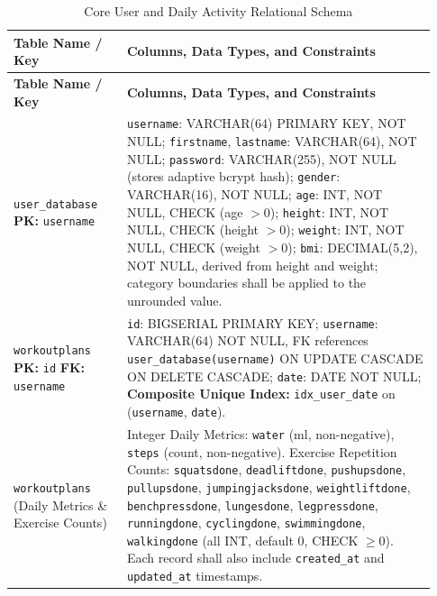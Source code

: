 \documentclass[11pt,a4paper]{report}
\begin{document}
\begin{longtable}{P{0.25\linewidth}P{0.68\linewidth}}
\caption{Core User and Daily Activity Relational Schema}\label{tab:core-schema}\\
\toprule
\textbf{Table Name / Key} & \textbf{Columns, Data Types, and Constraints} \\
\midrule
\endfirsthead
\toprule
\textbf{Table Name / Key} & \textbf{Columns, Data Types, and Constraints} \\
\midrule
\endhead
\texttt{user\_database} \newline \textbf{PK:} \texttt{username} & \texttt{username}: VARCHAR(64) PRIMARY KEY, NOT NULL; \newline \texttt{firstname}, \texttt{lastname}: VARCHAR(64), NOT NULL; \newline \texttt{password}: VARCHAR(255), NOT NULL (stores adaptive bcrypt hash); \newline \texttt{gender}: VARCHAR(16), NOT NULL; \newline \texttt{age}: INT, NOT NULL, CHECK (age $> 0$); \newline \texttt{height}: INT, NOT NULL, CHECK (height $> 0$); \newline \texttt{weight}: INT, NOT NULL, CHECK (weight $> 0$); \newline \texttt{bmi}: DECIMAL(5,2), NOT NULL, derived from height and weight; category boundaries shall be applied to the unrounded value. \\
\midrule
\texttt{workoutplans} \newline \textbf{PK:} \texttt{id} \newline \textbf{FK:} \texttt{username} & \texttt{id}: BIGSERIAL PRIMARY KEY; \newline \texttt{username}: VARCHAR(64) NOT NULL, FK references \texttt{user\_database(username)} ON UPDATE CASCADE ON DELETE CASCADE; \newline \texttt{date}: DATE NOT NULL; \newline \textbf{Composite Unique Index:} \texttt{idx\_user\_date} on (\texttt{username}, \texttt{date}). \\
\midrule
\texttt{workoutplans} \newline (Daily Metrics \& Exercise Counts) & Integer Daily Metrics: \texttt{water} (ml, non-negative), \texttt{steps} (count, non-negative). \newline Exercise Repetition Counts: \texttt{squatsdone}, \texttt{deadliftdone}, \texttt{pushupsdone}, \texttt{pullupsdone}, \texttt{jumpingjacksdone}, \texttt{weightliftdone}, \texttt{benchpressdone}, \texttt{lungesdone}, \texttt{legpressdone}, \texttt{runningdone}, \texttt{cyclingdone}, \texttt{swimmingdone}, \texttt{walkingdone} (all INT, default 0, CHECK $\ge 0$). \newline Each record shall also include \texttt{created\_at} and \texttt{updated\_at} timestamps. \\

\end{longtable}
\end{document}

